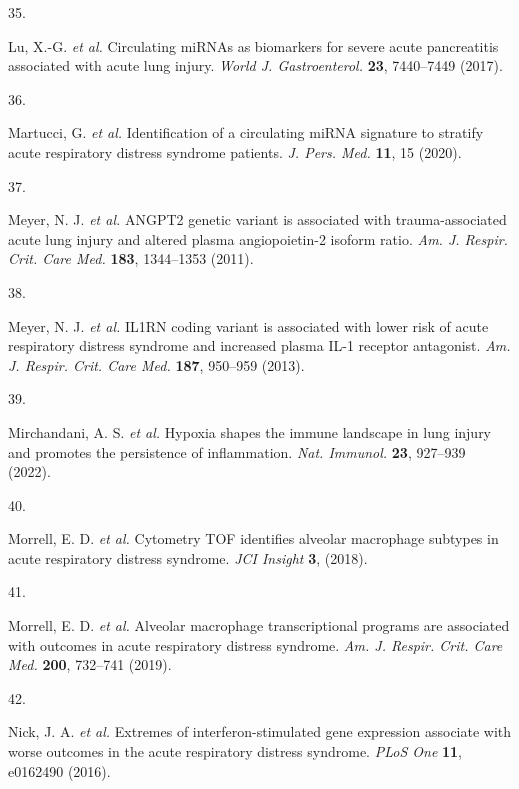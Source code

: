 \documentclass[
  11,
  a4paper,
]{article}
\newlength{\cslhangindent}
\newlength{\csllabelwidth}
\newlength{\cslentryspacingunit} %
\newenvironment{CSLReferences}[2] %
 {%
  \setlength{\parindent}{0pt}
  \ifodd #1
  \let\oldpar\par
  \def\par{\hangindent=\cslhangindent\oldpar}
  \fi
  \setlength{\parskip}{#2\cslentryspacingunit}
 }%
 {}
\newcommand{\CSLLeftMargin}[1]{\parbox[t]{\csllabelwidth}{#1}}
\newcommand{\CSLRightInline}[1]{\parbox[t]{\linewidth - \csllabelwidth}{#1}\break}
\begin{document}
\begin{CSLReferences}{0}{0}
\leavevmode{}%
\CSLLeftMargin{35. }%
\CSLRightInline{Lu, X.-G. \emph{et al.} Circulating {miRNAs} as
biomarkers for severe acute pancreatitis associated with acute lung
injury. \emph{World J. Gastroenterol.} \textbf{23}, 7440--7449 (2017).}

\leavevmode{}%
\CSLLeftMargin{36. }%
\CSLRightInline{Martucci, G. \emph{et al.} Identification of a
circulating {miRNA} signature to stratify acute respiratory distress
syndrome patients. \emph{J. Pers. Med.} \textbf{11}, 15 (2020).}

\leavevmode{}%
\CSLLeftMargin{37. }%
\CSLRightInline{Meyer, N. J. \emph{et al.} {ANGPT2} genetic variant is
associated with trauma-associated acute lung injury and altered plasma
angiopoietin-2 isoform ratio. \emph{Am. J. Respir. Crit. Care Med.}
\textbf{183}, 1344--1353 (2011).}

\leavevmode{}%
\CSLLeftMargin{38. }%
\CSLRightInline{Meyer, N. J. \emph{et al.} {IL1RN} coding variant is
associated with lower risk of acute respiratory distress syndrome and
increased plasma {IL-1} receptor antagonist. \emph{Am. J. Respir. Crit.
Care Med.} \textbf{187}, 950--959 (2013).}

\leavevmode{}%
\CSLLeftMargin{39. }%
\CSLRightInline{Mirchandani, A. S. \emph{et al.} Hypoxia shapes the
immune landscape in lung injury and promotes the persistence of
inflammation. \emph{Nat. Immunol.} \textbf{23}, 927--939 (2022).}

\leavevmode{}%
\CSLLeftMargin{40. }%
\CSLRightInline{Morrell, E. D. \emph{et al.} Cytometry {TOF} identifies
alveolar macrophage subtypes in acute respiratory distress syndrome.
\emph{JCI Insight} \textbf{3}, (2018).}

\leavevmode{}%
\CSLLeftMargin{41. }%
\CSLRightInline{Morrell, E. D. \emph{et al.} Alveolar macrophage
transcriptional programs are associated with outcomes in acute
respiratory distress syndrome. \emph{Am. J. Respir. Crit. Care Med.}
\textbf{200}, 732--741 (2019).}

\leavevmode{}%
\CSLLeftMargin{42. }%
\CSLRightInline{Nick, J. A. \emph{et al.} Extremes of
interferon-stimulated gene expression associate with worse outcomes in
the acute respiratory distress syndrome. \emph{PLoS One} \textbf{11},
e0162490 (2016).}


\end{CSLReferences}
\end{document}

